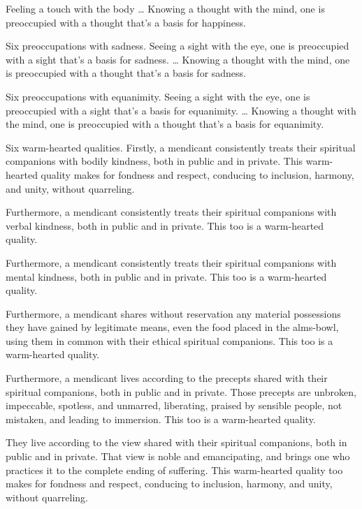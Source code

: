 \documentclass[12pt,openany]{book}%
\begin{document}
Feeling a touch with the body … Knowing a thought with the mind, one is preoccupied with a thought that’s a basis for happiness. 

Six preoccupations with sadness. Seeing a sight with the eye, one is preoccupied with a sight that’s a basis for sadness. … Knowing a thought with the mind, one is preoccupied with a thought that’s a basis for sadness. 

Six preoccupations with equanimity. Seeing a sight with the eye, one is preoccupied with a sight that’s a basis for equanimity. … Knowing a thought with the mind, one is preoccupied with a thought that’s a basis for equanimity. 

Six warm-hearted qualities. Firstly, a mendicant consistently treats their spiritual companions with bodily kindness, both in public and in private. This warm-hearted quality makes for fondness and respect, conducing to inclusion, harmony, and unity, without quarreling. 

Furthermore, a mendicant consistently treats their spiritual companions with verbal kindness, both in public and in private. This too is a warm-hearted quality. 

Furthermore, a mendicant consistently treats their spiritual companions with mental kindness, both in public and in private. This too is a warm-hearted quality. 

Furthermore, a mendicant shares without reservation any material possessions they have gained by legitimate means, even the food placed in the alms-bowl, using them in common with their ethical spiritual companions. This too is a warm-hearted quality. 

Furthermore, a mendicant lives according to the precepts shared with their spiritual companions, both in public and in private. Those precepts are unbroken, impeccable, spotless, and unmarred, liberating, praised by sensible people, not mistaken, and leading to immersion. This too is a warm-hearted quality. 

They live according to the view shared with their spiritual companions, both in public and in private. That view is noble and emancipating, and brings one who practices it to the complete ending of suffering. This warm-hearted quality too makes for fondness and respect, conducing to inclusion, harmony, and unity, without quarreling. 
\end{document}
